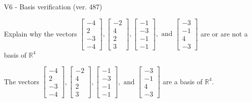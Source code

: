 \begin{exercise}
  \begin{exerciseTitle}V6 - Basis verification (ver. 487)\end{exerciseTitle}
  \begin{exerciseStatement}
    Explain why the vectors \(\left[\begin{array}{r}
-4 \\
2 \\
-3 \\
-4
\end{array}\right] , \left[\begin{array}{r}
-2 \\
4 \\
2 \\
3
\end{array}\right] , \left[\begin{array}{r}
-1 \\
-3 \\
-1 \\
-1
\end{array}\right] , \text{ and } \left[\begin{array}{r}
-3 \\
-1 \\
4 \\
-3
\end{array}\right]\) are or are not a basis of \(\mathbb{R}^4\)	


  \end{exerciseStatement}
  \begin{exerciseAnswer}
   The vectors \(\left[\begin{array}{r}
-4 \\
2 \\
-3 \\
-4
\end{array}\right] , \left[\begin{array}{r}
-2 \\
4 \\
2 \\
3
\end{array}\right] , \left[\begin{array}{r}
-1 \\
-3 \\
-1 \\
-1
\end{array}\right] , \text{ and } \left[\begin{array}{r}
-3 \\
-1 \\
4 \\
-3
\end{array}\right]\) 
  	 are  a basis of \(\mathbb{R}^4\).
  


  \end{exerciseAnswer}
\end{exercise}